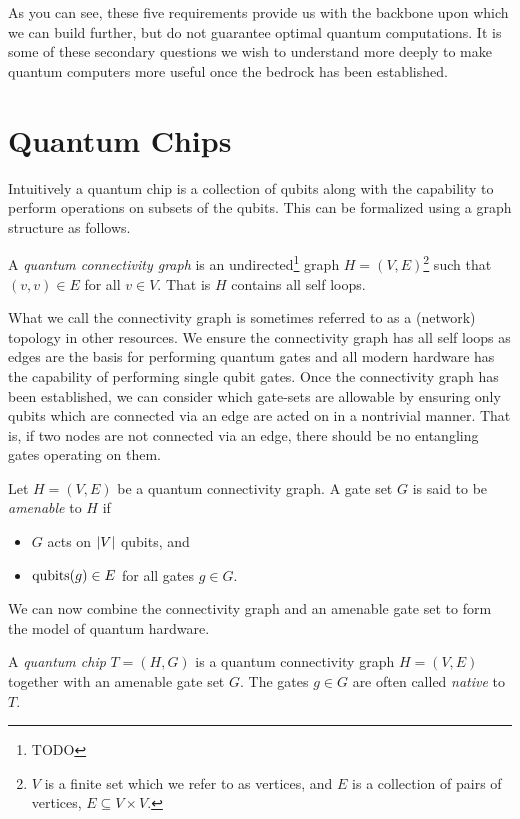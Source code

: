 As you can see, these five requirements provide us with the backbone upon which we can build further, but do not guarantee optimal quantum computations.
It is some of these secondary questions we wish to understand more deeply to make quantum computers more useful once the bedrock has been established.

\section{Quantum Chips}

Intuitively a quantum chip is a collection of qubits along with the capability to perform operations on subsets of the qubits.
This can be formalized using a graph structure as follows. %

\begin{definition}\label{def:topology}
    A \emph{quantum connectivity graph} is an undirected\footnote{TODO} graph $H = (V, E)$\footnote{$V$ is a finite set which we refer to as vertices, and $E$ is a collection of pairs of vertices, \ie{} $E \subseteq V \times V$.} such that $(v, v) \in E$ for all $v \in V$.
    That is $H$ contains all self loops.
\end{definition}
What we call the connectivity graph is sometimes referred to as a (network) topology in other resources.
We ensure the connectivity graph has all self loops as edges are the basis for performing quantum gates and all modern hardware has the capability of performing single qubit gates.
Once the connectivity graph has been established, we can consider which gate-sets are allowable by ensuring only qubits which are connected via an edge are acted on in a nontrivial manner.
That is, if two nodes are not connected via an edge, there should be no entangling gates operating on them. %
\begin{definition}
    Let $H = (V, E)$ be a quantum connectivity graph.
    A gate set $G$ is said to be \emph{amenable} to $H$ if
    \begin{itemize}
        \item $G$ acts on $\abs{V}$ qubits, and
        \item $\operatorname{qubits}(g) \in E$ for all gates $g \in G$.
    \end{itemize}
\end{definition}
We can now combine the connectivity graph and an amenable gate set to form the model of quantum hardware.
\begin{definition}
    A \emph{quantum chip} $T = (H, G)$ is a quantum connectivity graph $H = (V, E)$ together with an amenable gate set $G$.
    The gates $g \in G$ are often called \emph{native} to $T$.
\end{definition}

